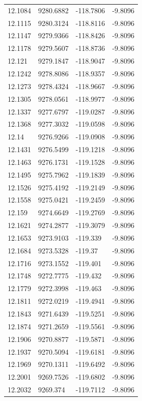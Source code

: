 \begin{table}[H]
\begin{tabular}{llll}
12.1084 & 9280.6882 & -118.7806 & -9.8096 \\
12.1115 & 9280.3124 & -118.8116 & -9.8096 \\
12.1147 & 9279.9366 & -118.8426 & -9.8096 \\
12.1178 & 9279.5607 & -118.8736 & -9.8096 \\
12.121 & 9279.1847 & -118.9047 & -9.8096 \\
12.1242 & 9278.8086 & -118.9357 & -9.8096 \\
12.1273 & 9278.4324 & -118.9667 & -9.8096 \\
12.1305 & 9278.0561 & -118.9977 & -9.8096 \\
12.1337 & 9277.6797 & -119.0287 & -9.8096 \\
12.1368 & 9277.3032 & -119.0598 & -9.8096 \\
12.14 & 9276.9266 & -119.0908 & -9.8096 \\
12.1431 & 9276.5499 & -119.1218 & -9.8096 \\
12.1463 & 9276.1731 & -119.1528 & -9.8096 \\
12.1495 & 9275.7962 & -119.1839 & -9.8096 \\
12.1526 & 9275.4192 & -119.2149 & -9.8096 \\
12.1558 & 9275.0421 & -119.2459 & -9.8096 \\
12.159 & 9274.6649 & -119.2769 & -9.8096 \\
12.1621 & 9274.2877 & -119.3079 & -9.8096 \\
12.1653 & 9273.9103 & -119.339 & -9.8096 \\
12.1684 & 9273.5328 & -119.37 & -9.8096 \\
12.1716 & 9273.1552 & -119.401 & -9.8096 \\
12.1748 & 9272.7775 & -119.432 & -9.8096 \\
12.1779 & 9272.3998 & -119.463 & -9.8096 \\
12.1811 & 9272.0219 & -119.4941 & -9.8096 \\
12.1843 & 9271.6439 & -119.5251 & -9.8096 \\
12.1874 & 9271.2659 & -119.5561 & -9.8096 \\
12.1906 & 9270.8877 & -119.5871 & -9.8096 \\
12.1937 & 9270.5094 & -119.6181 & -9.8096 \\
12.1969 & 9270.1311 & -119.6492 & -9.8096 \\
12.2001 & 9269.7526 & -119.6802 & -9.8096 \\
12.2032 & 9269.374 & -119.7112 & -9.8096 \\

\end{tabular}
\end{table}
